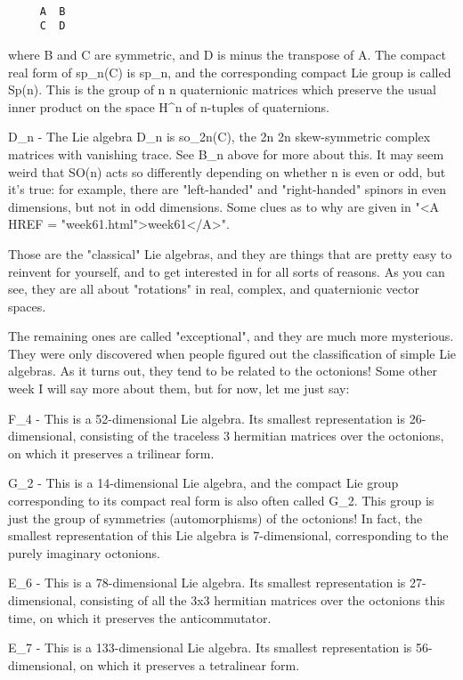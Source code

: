 \begin{verbatim}

     A  B
     C  D
\end{verbatim}
    

where B and C are symmetric, and D is minus the transpose of A.  The
compact real form of sp_{n}(C) is sp_{n}, and the
corresponding compact Lie group is called Sp(n).  This is the group of
n \times  n quaternionic matrices which preserve the usual inner product on
the space H^{n} of n-tuples of quaternions.

D_{n} - The Lie algebra D_{n} is so_{2n}(C),
the 2n \times  2n skew-symmetric complex matrices with vanishing trace.  See
B_{n} above for more about this.  It may seem weird that SO(n)
acts so differently depending on whether n is even or odd, but it's
true: for example, there are "left-handed" and "right-handed" spinors
in even dimensions, but not in odd dimensions.  Some clues as to why
are given in "<A HREF = "week61.html">week61</A>".

Those are the "classical" Lie algebras, and they are things that are
pretty easy to reinvent for yourself, and to get interested in for all
sorts of reasons.  As you can see, they are all about "rotations" in 
real, complex, and quaternionic vector spaces.  

The remaining ones are called "exceptional", and they are much more
mysterious.  They were only discovered when people figured out the
classification of simple Lie algebras.  As it turns out, they tend to be
related to the octonions!  Some other week I will say more about them,
but for now, let me just say:

F_{4} - This is a 52-dimensional Lie algebra.  Its smallest
representation is 26-dimensional, consisting of the traceless
3 hermitian matrices over the octonions, on which it preserves
a trilinear form.  

G_{2} - This is a 14-dimensional Lie algebra, and the
compact Lie group corresponding to its compact real form is also often
called G_{2}.  This group is just the group of symmetries
(automorphisms) of the octonions!  In fact, the smallest
representation of this Lie algebra is 7-dimensional, corresponding to
the purely imaginary octonions.

E_{6} - This is a 78-dimensional Lie algebra.  Its smallest
representation is 27-dimensional, consisting of all the 3x3 hermitian
matrices over the octonions this time, on which it preserves the
anticommutator.  

E_{7} - This is a 133-dimensional Lie algebra.  Its smallest 
representation is 56-dimensional, on which it preserves a tetralinear
form. 

